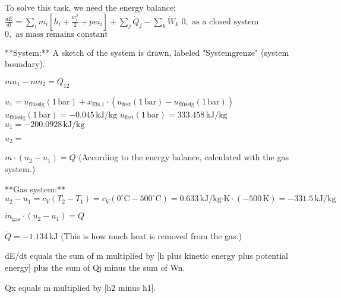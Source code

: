 To solve this task, we need the energy balance:  
\( \frac{dE}{dt} = \sum_i m_i [h_i + \frac{w_i^2}{2} + pei_i] + \sum_j \dot{Q}_j - \sum_k \dot{W}_k \)  
\( 0, \text{ as a closed system} \)  
\( 0, \text{ as mass remains constant} \)  

**System:**  
A sketch of the system is drawn, labeled "Systemgrenze" (system boundary).  

\( mu_1 - mu_2 = Q_{12} \)  

\( u_1 = u_{\text{flüssig}} (1 \, \text{bar}) + x_{\text{Eis,1}} \cdot (u_{\text{fest}} (1 \, \text{bar}) - u_{\text{flüssig}} (1 \, \text{bar})) \)  
\( u_{\text{flüssig}} (1 \, \text{bar}) = -0.045 \, \text{kJ/kg} \)  
\( u_{\text{fest}} (1 \, \text{bar}) = 333.458 \, \text{kJ/kg} \)  
\( u_1 = -200.0928 \, \text{kJ/kg} \)  

\( u_2 = \)  

\( m \cdot (u_2 - u_1) = \dot{Q} \)  
(According to the energy balance, calculated with the gas system.)  

**Gas system:**  
\( u_2 - u_1 = c_V (T_2 - T_1) = c_V (0^\circ \text{C} - 500^\circ \text{C}) = 0.633 \, \text{kJ/kg·K} \cdot (-500 \, \text{K}) = -331.5 \, \text{kJ/kg} \)  

\( \dot{m}_{\text{gas}} \cdot (u_2 - u_1) = Q \)  

\( \dot{Q} = -1.134 \, \text{kJ} \)  
(This is how much heat is removed from the gas.)

dE/dt equals the sum of m multiplied by [h plus kinetic energy plus potential energy] plus the sum of Qj minus the sum of Wn.  

Qx equals m multiplied by [h2 minus h1].